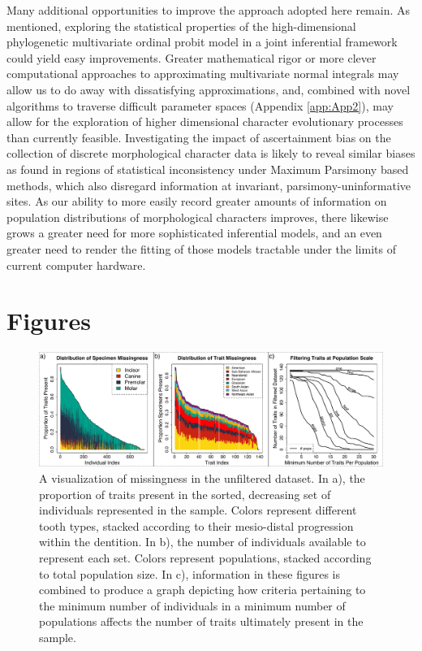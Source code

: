 Many additional opportunities to improve the approach adopted here remain. As mentioned, exploring the statistical properties of the high-dimensional phylogenetic multivariate ordinal probit model in a joint inferential framework could yield easy improvements. Greater mathematical rigor or more clever computational approaches to approximating multivariate normal integrals may allow us to do away with dissatisfying approximations, and, combined with novel algorithms to traverse difficult parameter spaces (Appendix \ref{app:App2}), may allow for the exploration of higher dimensional character evolutionary processes than currently feasible. Investigating the impact of ascertainment bias on the collection of discrete morphological character data is likely to reveal similar biases as found in regions of statistical inconsistency under Maximum Parsimony based methods, which also disregard information at invariant, parsimony-uninformative sites. As our ability to more easily record greater amounts of information on population distributions of morphological characters improves, there likewise grows a greater need for more sophisticated inferential models, and an even greater need to render the fitting of those models tractable under the limits of current computer hardware.

\clearpage

\section{Figures}

\begin{figure}[h]
\centering
\includegraphics[width=160mm]{figures/bailey_figure1.pdf}
\caption[Discrete Dental Missingness Visualization]{A visualization of missingness in the unfiltered dataset. In a), the proportion of traits present in the sorted, decreasing set of individuals represented in the sample. Colors represent different tooth types, stacked according to their mesio-distal progression within the dentition. In b), the number of individuals available to represent each set. Colors represent populations, stacked according to total population size. In c), information in these figures is combined to produce a graph depicting how criteria pertaining to the minimum number of individuals in a minimum number of populations affects the number of traits ultimately present in the sample. \label{overflow}
\label{fig:missingnessDENTAL}}
\end{figure}

